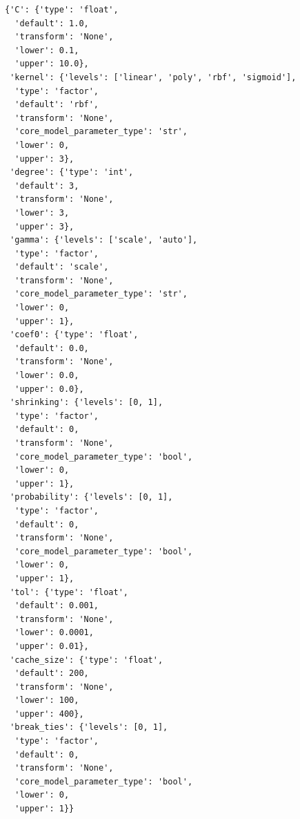 \documentclass[
  letterpaper,
  DIV=11,
  numbers=noendperiod]{scrreprt}
\begin{document}
\begin{verbatim}
{'C': {'type': 'float',
  'default': 1.0,
  'transform': 'None',
  'lower': 0.1,
  'upper': 10.0},
 'kernel': {'levels': ['linear', 'poly', 'rbf', 'sigmoid'],
  'type': 'factor',
  'default': 'rbf',
  'transform': 'None',
  'core_model_parameter_type': 'str',
  'lower': 0,
  'upper': 3},
 'degree': {'type': 'int',
  'default': 3,
  'transform': 'None',
  'lower': 3,
  'upper': 3},
 'gamma': {'levels': ['scale', 'auto'],
  'type': 'factor',
  'default': 'scale',
  'transform': 'None',
  'core_model_parameter_type': 'str',
  'lower': 0,
  'upper': 1},
 'coef0': {'type': 'float',
  'default': 0.0,
  'transform': 'None',
  'lower': 0.0,
  'upper': 0.0},
 'shrinking': {'levels': [0, 1],
  'type': 'factor',
  'default': 0,
  'transform': 'None',
  'core_model_parameter_type': 'bool',
  'lower': 0,
  'upper': 1},
 'probability': {'levels': [0, 1],
  'type': 'factor',
  'default': 0,
  'transform': 'None',
  'core_model_parameter_type': 'bool',
  'lower': 0,
  'upper': 1},
 'tol': {'type': 'float',
  'default': 0.001,
  'transform': 'None',
  'lower': 0.0001,
  'upper': 0.01},
 'cache_size': {'type': 'float',
  'default': 200,
  'transform': 'None',
  'lower': 100,
  'upper': 400},
 'break_ties': {'levels': [0, 1],
  'type': 'factor',
  'default': 0,
  'transform': 'None',
  'core_model_parameter_type': 'bool',
  'lower': 0,
  'upper': 1}}
\end{verbatim}
\end{document}
